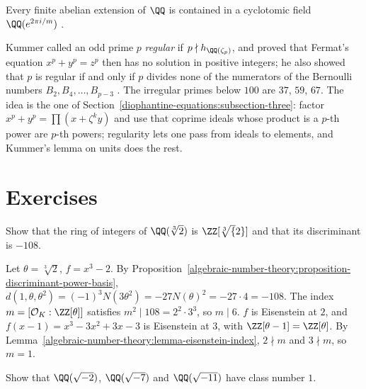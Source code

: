 \begin{theorem}\label{algebraic-number-theory:theorem-kronecker-weber}
Every finite abelian extension of $\QQ$ is contained in a cyclotomic field $\QQ(e^{2\pi i/m})$ \cite{neukirch-ant}.
\end{theorem}

\begin{remark}\label{algebraic-number-theory:remark-kummer-regular}
Kummer called an odd prime $p$ \emph{regular} if $p \nmid h_{\QQ(\zeta_p)}$, and proved that Fermat's equation $x^p + y^p = z^p$ then has no solution in positive integers; he also showed that $p$ is regular if and
only if $p$ divides none of the numerators of the Bernoulli numbers $B_2, B_4, \dots, B_{p-3}$ \cite[Theorem 5.34 and Chapter 9]{washington-cyclotomic}. The irregular primes below $100$ are $37$, $59$, $67$.
The idea is the one of Section~\ref{diophantine-equations:subsection-three}: factor $x^p + y^p = \prod(x + \zeta^ky)$ and use that coprime ideals whose product is a $p$-th power are $p$-th powers; regularity
lets one pass from ideals to elements, and Kummer's lemma on units does the rest.
\end{remark}

\section{Exercises}\label{algebraic-number-theory:section-exercises}

\begin{exercise}\label{algebraic-number-theory:exercise-cube-root-two}
Show that the ring of integers of $\QQ(\sqrt[3]{2})$ is $\ZZ[\sqrt[3]{2}]$ and that its discriminant is $-108$.
\end{exercise}

\begin{solution}
Let $\theta = \sqrt[3]{2}$, $f = x^3 - 2$. By Proposition~\ref{algebraic-number-theory:proposition-discriminant-power-basis}, $d(1, \theta, \theta^2) = (-1)^3N(3\theta^2) = -27N(\theta)^2 = -27 \cdot 4 = -108$. The
index $m = [\mathcal{O}_K : \ZZ[\theta]]$ satisfies $m^2 \mid 108 = 2^2 \cdot 3^3$, so $m \mid 6$. $f$ is Eisenstein at $2$, and $f(x - 1) = x^3 - 3x^2 + 3x - 3$ is Eisenstein at $3$, with $\ZZ[\theta - 1] = \ZZ[\theta]$.
By Lemma~\ref{algebraic-number-theory:lemma-eisenstein-index}, $2 \nmid m$ and $3 \nmid m$, so $m = 1$.
\end{solution}

\begin{exercise}\label{algebraic-number-theory:exercise-class-number-one}
Show that $\QQ(\sqrt{-2})$, $\QQ(\sqrt{-7})$ and $\QQ(\sqrt{-11})$ have class number $1$.
\end{exercise}

